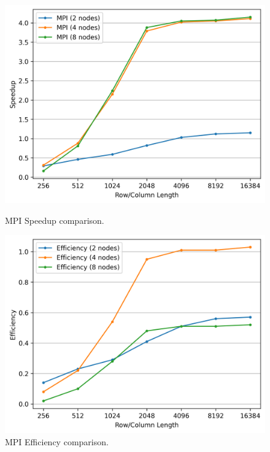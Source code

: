 \begin{figure}[h!]
    \begin{minipage}[t]{0.49\textwidth}
        \centering
        \includegraphics[width=\textwidth]{img/MPI/mpi_speedup.png}
        \caption{MPI Speedup comparison.}
        \label{MPI_Speedup}
    \end{minipage}
    \hfill
    \begin{minipage}[t]{0.49\textwidth}
        \centering
        \includegraphics[width=\textwidth]{img/MPI/mpi_efficiency.png}
        \caption{MPI Efficiency comparison.}
        \label{MPI_Efficiency}
    \end{minipage}
    

\end{figure}
